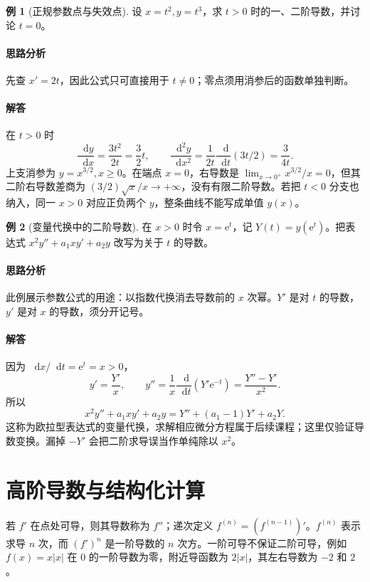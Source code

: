 \documentclass[UTF8,fontset=fandol,12pt,oneside,openany]{ctexrep}
\newcommand{\dd}{\mathop{}\!\mathrm d}
\newcommand{\ee}{\mathrm e}
\theoremstyle{definition}
\newtheorem{example}{例}[chapter]
\begin{document}
\begin{example}[正规参数点与失效点]
设 $x=t^2,y=t^3$，求 $t>0$ 时的一、二阶导数，并讨论 $t=0$。
\end{example}
\paragraph{思路分析}先查 $x'=2t$，因此公式只可直接用于 $t\ne0$；零点须用消参后的函数单独判断。
\paragraph{解答}在 $t>0$ 时
\[
 \frac{\dd y}{\dd x}=\frac{3t^2}{2t}=\frac32t,\qquad
 \frac{\dd^2y}{\dd x^2}=\frac1{2t}\frac{\dd}{\dd t}(3t/2)=\frac3{4t}.
\]
上支消参为 $y=x^{3/2},x\ge0$。在端点 $x=0$，右导数是
$\lim_{x\to0^+}x^{3/2}/x=0$，但其二阶右导数差商为 $(3/2)\sqrt{x}/x\to+\infty$，没有有限二阶导数。若把 $t<0$ 分支也纳入，同一 $x>0$ 对应正负两个 $y$，整条曲线不能写成单值 $y(x)$。

\begin{example}[变量代换中的二阶导数]
在 $x>0$ 时令 $x=\ee^t$，记 $Y(t)=y(\ee^t)$。把表达式 $x^2y''+a_1xy'+a_2y$ 改写为关于 $t$ 的导数。
\end{example}
\paragraph{思路分析}此例展示参数公式的用途：以指数代换消去导数前的 $x$ 次幂。$Y'$ 是对 $t$ 的导数，$y'$ 是对 $x$ 的导数，须分开记号。
\paragraph{解答}因为 $\dd x/\dd t=\ee^t=x>0$，
\[
 y'=\frac{Y'}x,\qquad
 y''=\frac1x\frac{\dd}{\dd t}(Y'\ee^{-t})
 =\frac{Y''-Y'}{x^2}.
\]
所以
\[
 x^2y''+a_1xy'+a_2y=Y''+(a_1-1)Y'+a_2Y.
\]
这称为欧拉型表达式的变量代换，求解相应微分方程属于后续课程；这里仅验证导数变换。漏掉 $-Y'$ 会把二阶求导误当作单纯除以 $x^2$。

\section{高阶导数与结构化计算}
\label{lec:05:higher}

若 $f'$ 在点处可导，则其导数称为 $f''$；递次定义 $f^{(n)}=(f^{(n-1)})'$。$f^{(n)}$ 表示求导 $n$ 次，而 $(f')^n$ 是一阶导数的 $n$ 次方。一阶可导不保证二阶可导，例如 $f(x)=x|x|$ 在 $0$ 的一阶导数为零，附近导函数为 $2|x|$，其左右导数为 $-2$ 和 $2$。
\end{document}
